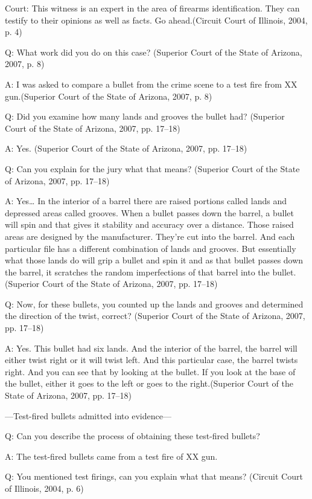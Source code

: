 \documentclass[print]{nuthesis}
\begin{document}
Court: This witness is an expert in the area of firearms identification.
They can testify to their opinions as well as facts.
Go ahead.(Circuit Court of Illinois, 2004, p. 4)

Q: What work did you do on this case? (Superior Court of the State of Arizona, 2007, p. 8)

A: I was asked to compare a bullet from the crime scene to a test fire from XX gun.(Superior Court of the State of Arizona, 2007, p. 8)

Q: Did you examine how many lands and grooves the bullet had? (Superior Court of the State of Arizona, 2007, pp. 17--18)

A: Yes. (Superior Court of the State of Arizona, 2007, pp. 17--18)

Q: Can you explain for the jury what that means? (Superior Court of the State of Arizona, 2007, pp. 17--18)

A: Yes\ldots{} In the interior of a barrel there are raised portions called lands and depressed areas called grooves.
When a bullet passes down the barrel, a bullet will spin and that gives it stability and accuracy over a distance.
Those raised areas are designed by the manufacturer.
They're cut into the barrel.
And each particular file has a different combination of lands and grooves.
But essentially what those lands do will grip a bullet and spin it and as that bullet passes down the barrel, it scratches the random imperfections of that barrel into the bullet.(Superior Court of the State of Arizona, 2007, pp. 17--18)

Q: Now, for these bullets, you counted up the lands and grooves and determined the direction of the twist, correct? (Superior Court of the State of Arizona, 2007, pp. 17--18)

A: Yes. This bullet had six lands. And the interior of the barrel, the barrel will either twist right or it will twist left.
And this particular case, the barrel twists right.
And you can see that by looking at the bullet.
If you look at the base of the bullet, either it goes to the left or goes to the right.(Superior Court of the State of Arizona, 2007, pp. 17--18)

---Test-fired bullets admitted into evidence---

Q: Can you describe the process of obtaining these test-fired bullets?

A: The test-fired bullets came from a test fire of XX gun.

Q: You mentioned test firings, can you explain what that means? (Circuit Court of Illinois, 2004, p. 6)
\end{document}
